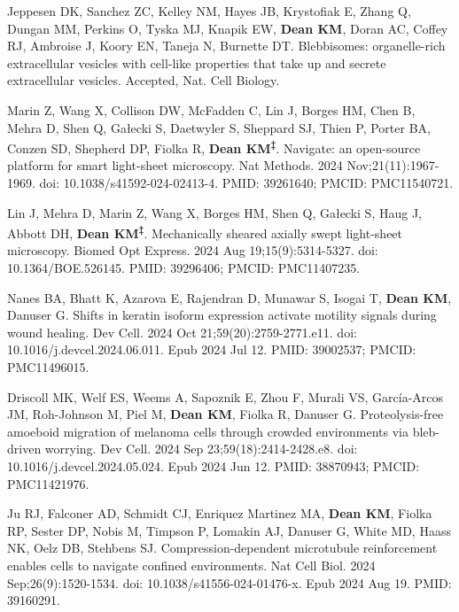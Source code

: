 \begin{etaremune}

\item Jeppesen DK, Sanchez ZC, Kelley NM, Hayes JB, Krystofiak E, Zhang Q, Dungan MM, Perkins O, Tyska MJ, Knapik EW, \textbf{Dean KM}, Doran AC, Coffey RJ, Ambroise J, Koory EN, Taneja N, Burnette DT. Blebbisomes: organelle-rich extracellular vesicles with cell-like properties that take up and secrete extracellular vesicles. Accepted, Nat. Cell Biology.

\item Marin Z, Wang X, Collison DW, McFadden C, Lin J, Borges HM, Chen B, Mehra D, Shen Q, Gałecki S, Daetwyler S, Sheppard SJ, Thien P, Porter BA, Conzen SD, Shepherd DP, Fiolka R, \textbf{Dean KM\textsuperscript{‡}}. Navigate: an open-source platform for smart light-sheet microscopy. Nat Methods. 2024 Nov;21(11):1967-1969. doi: 10.1038/s41592-024-02413-4. PMID: 39261640; PMCID: PMC11540721.

\item Lin J, Mehra D, Marin Z, Wang X, Borges HM, Shen Q, Gałecki S, Haug J, Abbott DH, \textbf{Dean KM\textsuperscript{‡}}. Mechanically sheared axially swept light-sheet microscopy. Biomed Opt Express. 2024 Aug 19;15(9):5314-5327. doi: 10.1364/BOE.526145. PMID: 39296406; PMCID: PMC11407235.

\item Nanes BA, Bhatt K, Azarova E, Rajendran D, Munawar S, Isogai T, \textbf{Dean KM}, Danuser G. Shifts in keratin isoform expression activate motility signals during wound healing. Dev Cell. 2024 Oct 21;59(20):2759-2771.e11. doi: 10.1016/j.devcel.2024.06.011. Epub 2024 Jul 12. PMID: 39002537; PMCID: PMC11496015.

\item Driscoll MK, Welf ES, Weems A, Sapoznik E, Zhou F, Murali VS, García-Arcos JM, Roh-Johnson M, Piel M, \textbf{Dean KM}, Fiolka R, Danuser G. Proteolysis-free amoeboid migration of melanoma cells through crowded environments via bleb-driven worrying. Dev Cell. 2024 Sep 23;59(18):2414-2428.e8. doi: 10.1016/j.devcel.2024.05.024. Epub 2024 Jun 12. PMID: 38870943; PMCID: PMC11421976.

\item Ju RJ, Falconer AD, Schmidt CJ, Enriquez Martinez MA, \textbf{Dean KM}, Fiolka RP, Sester DP, Nobis M, Timpson P, Lomakin AJ, Danuser G, White MD, Haass NK, Oelz DB, Stehbens SJ. Compression-dependent microtubule reinforcement enables cells to navigate confined environments. Nat Cell Biol. 2024 Sep;26(9):1520-1534. doi: 10.1038/s41556-024-01476-x. Epub 2024 Aug 19. PMID: 39160291.


\end{etaremune}
